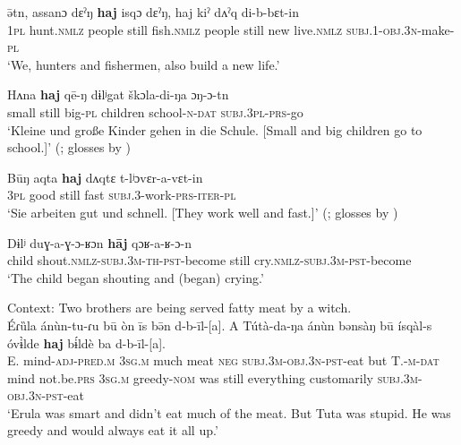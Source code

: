 \begin{exe}
	\ex\label{exAppendixKetCoordinator1}
	\gll ə̄tn, assanɔ dɛˀŋ \textbf{haj} isqɔ dɛˀŋ,	haj kiˀ dʌˀq di-b-bɛt-in\\
	1\textsc{pl} hunt.\textsc{nmlz} people still fish.\textsc{nmlz} people still new live.\textsc{nmlz} \textsc{subj}.1-\textsc{obj}.3\textsc{n}-make-\textsc{pl}\\
	\glt \lq We, hunters and fishermen, also build a new life.' \parencite[97]{Nefedov2015}

	\ex\label{exAppendixKetCoordinator2}
	\gll Hʌna \textbf{haj} qē-ŋ dɨlʲgat škɔla-di-ŋa ɔŋ-ɔ-tn\\
	small still big-\textsc{pl} children school-\textsc{n}-\textsc{dat} \textsc{subj}.3\textsc{pl}-\textsc{prs}-go\\
	\glt \lq Kleine und große Kinder gehen in die Schule. [Small and big children go to school.]\rq{ }(\cite[321]{Werner1997}; glosses by \cite[97]{Nefedov2015})
 
	\ex\label{exAppendixKetCoordinator3}
	\gll Būŋ aqta \textbf{haj} dʌqtɛ t-lʲɔvɛr-a-vɛt-in\\
	3\textsc{pl} good still	fast \textsc{subj}.3-work-\textsc{prs}-\textsc{iter}-\textsc{pl}\\
	\glt \lq Sie arbeiten gut und schnell. [They work well and fast.]\rq{ }(\cite[321]{Werner1997}; glosses by \cite[97]{Nefedov2015})
 
 	\ex\label{exAppendixKetCoordinator4}
 	\gll Dɨlʲ duɣ-a-ɣ-ɔ-ʁɔn \textbf{hāj} qɔʁ-a-ʁ-ɔ-n\\
	child shout.\textsc{nmlz}-\textsc{subj}.3\textsc{m}-\textsc{th}-\textsc{pst}-become still cry.\textsc{nmlz}-\textsc{subj}.3\textsc{m}-\textsc{pst}-become\\
	\glt \lq The child began shouting and (began) crying.'  \parencite[97]{Nefedov2015}
	
	 	\ex\label{exAppendixKetCoordinator5}
	Context: Two brothers are being served fatty meat by a witch.\\
	\gll Éɾȕla ánùn-tu-ɾu bū òn īs bə̄n d-b-īl-[a]. A Tútà-da-ŋa ánùn bənsàŋ bū ísqàl-s óvɨ̀lde \textbf{haj} bɨ́ldè ba d-b-īl-[a].\\
	E. mind-\textsc{adj}-\textsc{pred}.\textsc{m} 3\textsc{sg}.\textsc{m} much meat \textsc{neg} \textsc{subj}.3\textsc{m}-\textsc{obj}.3\textsc{n}-\textsc{pst}-eat but T.-\textsc{m}-\textsc{dat}  mind not.be.\textsc{prs} 3\textsc{sg}.\textsc{m} greedy-\textsc{nom} was still everything customarily \textsc{subj}.3\textsc{m}-\textsc{obj}.3\textsc{n}-\textsc{pst}-eat\\
	\glt \lq Erula was smart and didn't eat much of the meat. But Tuta was stupid. He was greedy and would always eat it all up.\rq{ }\parencite[93]{Vajda2004}
\end{exe}
	


